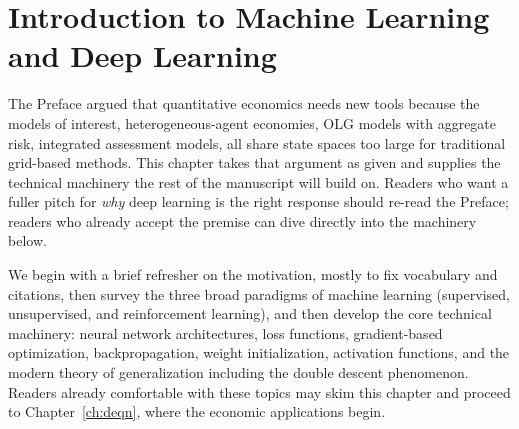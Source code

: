 \documentclass[11pt,a4paper]{report}
\begin{document}

\medskip
{}

\chapter{Introduction to Machine Learning and Deep Learning}
\label{ch:intro}

The Preface argued that quantitative economics needs new tools because the models of interest, heterogeneous-agent economies, OLG models with aggregate risk, integrated assessment models, all share state spaces too large for traditional grid-based methods.  This chapter takes that argument as given and supplies the technical machinery the rest of the manuscript will build on.  Readers who want a fuller pitch for \emph{why} deep learning is the right response should re-read the Preface; readers who already accept the premise can dive directly into the machinery below.

We begin with a brief refresher on the motivation, mostly to fix vocabulary and citations, then survey the three broad paradigms of machine learning (supervised, unsupervised, and reinforcement learning), and then develop the core technical machinery: neural network architectures, loss functions, gradient-based optimization, backpropagation, weight initialization, activation functions, and the modern theory of generalization including the double descent phenomenon.  Readers already comfortable with these topics may skim this chapter and proceed to Chapter~\ref{ch:deqn}, where the economic applications begin.
\end{document}
